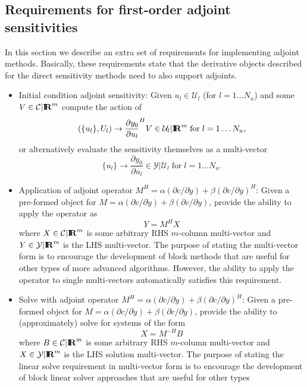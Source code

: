 \documentclass[pdf,ps2pdf,11pt]{SANDreport}
\begin{document}
\subsection{Requirements for first-order adjoint sensitivities}

In this section we describe an extra set of requirements for implementing
adjoint methods.  Basically, these requirements state that the derivative
objects described for the direct sensitivity methods need to also support
adjoints.

\begin{itemize}

{}\item Initial condition adjoint sensitivity: Given $u_l\in\mathcal{U}_l$ (for
$l=1\ldots{}N_u$) and some $V\in\mathcal{C}|\mbox{\textbf{I}}\hspace{-0.6ex}\mbox{\textbf{R}}^m$ compute the action of
\[
(\{u_l\},U_l) {}\rightarrow \frac{\partial y_0}{\partial u_l}^H V \in \mathcal{U}_l|\mbox{\textbf{I}}\hspace{-0.6ex}\mbox{\textbf{R}}^m
\; \mbox{for} \; l = 1 {}\ldots N_u,
\]
or alternatively evaluate the sensitivity themselves as a multi-vector
\[
\{u_l\} {}\rightarrow \frac{\partial y_0}{\partial u_l} \in \mathcal{Y}|\mathcal{U}_l
\; \mbox{for} \; l = 1 {}\ldots N_u.
\]
%
{}\item Application of adjoint operator $M^H = {}\alpha ({}\partial c /
{}\partial {}\dot{y}) + {}\beta ({}\partial c / {}\partial y)^H$: Given a
pre-formed object for $M = {}\alpha ({}\partial c / {}\partial {}\dot{y}) +
{}\beta ({}\partial c / {}\partial y)$, provide the ability to apply the
operator as
\[
Y = M^H X
\]
where $X\in\mathcal{C}|\mbox{\textbf{I}}\hspace{-0.6ex}\mbox{\textbf{R}}^m$ is some arbitrary RHS $m$-column multi-vector
and $Y\in\mathcal{Y}|\mbox{\textbf{I}}\hspace{-0.6ex}\mbox{\textbf{R}}^m$ is the LHS multi-vector.  The purpose of stating
the multi-vector form is to encourage the development of block methods that
are useful for other types of more advanced algorithms.  However, the ability
to apply the operator to single multi-vectors automatically satisfies this
requirement.
%
{}\item Solve with adjoint operator $M^H = {}\alpha ({}\partial c / {}\partial
{}\dot{y}) + {}\beta ({}\partial c / {}\partial y)^H$: Given a pre-formed
object for $M = {}\alpha ({}\partial c / {}\partial {}\dot{y}) + {}\beta
({}\partial c / {}\partial y)$, provide the ability to (approximately) solve
for systems of the form
\[
X = M^{-H} B
\]
where $B\in\mathcal{C}|\mbox{\textbf{I}}\hspace{-0.6ex}\mbox{\textbf{R}}^m$ is some arbitrary RHS $m$-column multi-vector
and $X\in\mathcal{Y}|\mbox{\textbf{I}}\hspace{-0.6ex}\mbox{\textbf{R}}^m$ is the LHS solution multi-vector.  The purpose of
stating the linear solve requirement in multi-vector form is to encourage the
development of block linear solver approaches that are useful for other types

\end{itemize}
\end{document}
